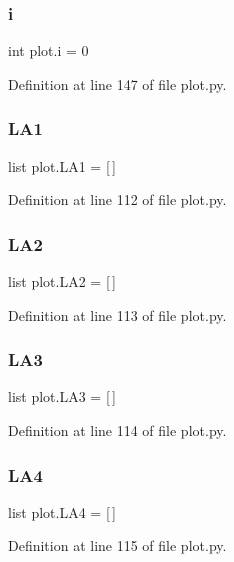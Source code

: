 \subsubsection{i}
{\footnotesize\ttfamily int plot.\+i = 0}



Definition at line 147 of file plot.\+py.

\mbox{\label{namespaceplot_acaf9647b2db4eb659038f7eec0e87362}} 
\subsubsection{L\+A1}
{\footnotesize\ttfamily list plot.\+L\+A1 = [$\,$]}



Definition at line 112 of file plot.\+py.

\mbox{\label{namespaceplot_a2a7a50ec1a3d0dbd24f480480d7359c8}} 
\subsubsection{L\+A2}
{\footnotesize\ttfamily list plot.\+L\+A2 = [$\,$]}



Definition at line 113 of file plot.\+py.

\mbox{\label{namespaceplot_a34bca046942806889dece7af4a1b5a47}} 
\subsubsection{L\+A3}
{\footnotesize\ttfamily list plot.\+L\+A3 = [$\,$]}



Definition at line 114 of file plot.\+py.

\mbox{\label{namespaceplot_a2be6cc211413b4b2c897f05786f3d227}} 
\subsubsection{L\+A4}
{\footnotesize\ttfamily list plot.\+L\+A4 = [$\,$]}



Definition at line 115 of file plot.\+py.

\mbox{\label{namespaceplot_ad4d89310d7231e118ee791d0443facfd}} 
